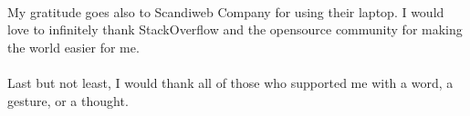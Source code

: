 \paragraph{}
My gratitude goes also to Scandiweb Company for using their laptop. I would love to infinitely thank StackOverflow and the opensource community for making the world easier for me.
\paragraph{}
Last but not least, I would thank all of those who supported me with a word, a gesture, or a thought. 